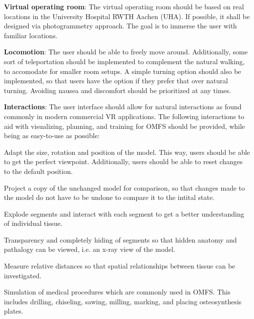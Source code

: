 \begin{compactenum}[label=(\textbf{\alph*})]
    \item\label{req::F1} \textbf{Virtual operating room}: The virtual operating room should be based on real locations in the University Hospital RWTH Aachen (UHA).
    If possible, it shall be designed via photogrammetry approach. The goal is to immerse the user with familiar locations.
    \item\label{req::F2} \textbf{Locomotion}: The user should be able to freely move around.
    Additionally, some sort of teleportation should be implemented to complement the natural walking, to accomodate for smaller room setups.
    A simple turning option should also be implemented, so that users have the option if they prefer that over natural turning.
    Avoiding nausea and discomfort should be prioritized at any times.
    \item\label{req::F3} \textbf{Interactions}: The user interface should allow for natural interactions as found commonly in modern commercial VR applications.
    The following interactions to aid with visualizing, planning, and training for OMFS should be provided, while being as easy-to-use as possible:
    \begin{compactenum}[label=(\textbf{\alph*})]
        \item \label{req::F3.1}Adapt the size, rotation and position of the model.
        This way, users should be able to get the perfect viewpoint.
        Additionally, users should be able to reset changes to the default position.
        \item \label{req::F3.2}Project a copy of the unchanged model for comparison, so that changes made to the model do not have to be undone to compare it to the intital state.
        \item \label{req::F3.3}Explode segments and interact with each segment to get a better understanding of individual tissue.
        \item \label{req::F3.4}Transparency and completely hiding of segments so that hidden anatomy and pathalogy can be viewed, i.e. an x-ray view of the model.
        \item \label{req::F3.5}Measure relative distances so that spatial relationships between tissue can be investigated.
        \item \label{req::F3.6}Simulation of medical procedures which are commonly used in OMFS.
        This includes drilling, chiseling, sawing, milling, marking, and placing osteosynthesis plates.

\end{compactenum}
\end{compactenum}
